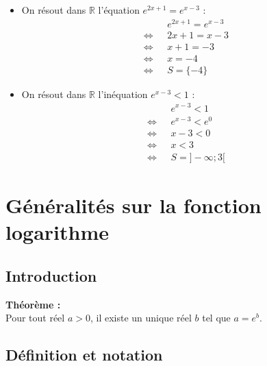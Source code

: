 \documentclass[11pt,a4paper]{article}
\begin{document}
\begin{minipage}{0.5\textwidth}
    \begin{itemize}
        \item On résout dans $\mathbb{R}$ l'équation $e^{2x+1}=e^{x-3}$ :
        \begin{align*}
            &e^{2x+1}=e^{x-3} \\
            \Leftrightarrow\text{ }&2x+1=x-3 \\
            \Leftrightarrow\text{ }&x+1=-3 \\
            \Leftrightarrow\text{ }&x=-4 \\
            \Leftrightarrow\text{ }&S=\{-4\}
        \end{align*}
    \end{itemize}
\end{minipage}
\hfill
\begin{minipage}{0.5\textwidth}
    \begin{itemize}
        \item On résout dans $\mathbb{R}$ l'inéquation $e^{x-3}<1$ :
        \begin{align*}
            &e^{x-3}<1 \\
            \Leftrightarrow\text{ }&e^{x-3}<e^0 \\
            \Leftrightarrow\text{ }&x-3<0 \\
            \Leftrightarrow\text{ }&x<3 \\
            \Leftrightarrow\text{ }&S=]-\infty;3[
        \end{align*}
    \end{itemize}
\end{minipage}

\section{Généralités sur la fonction logarithme}

\subsection{Introduction}

\begin{mdframed}[style=proprieteStyle]
    \textbf{Théorème :} ~\\
    Pour tout réel $a>0$, il existe un unique réel $b$ tel que $a=e^b$.
\end{mdframed}

\subsection{Définition et notation}
\end{document}
